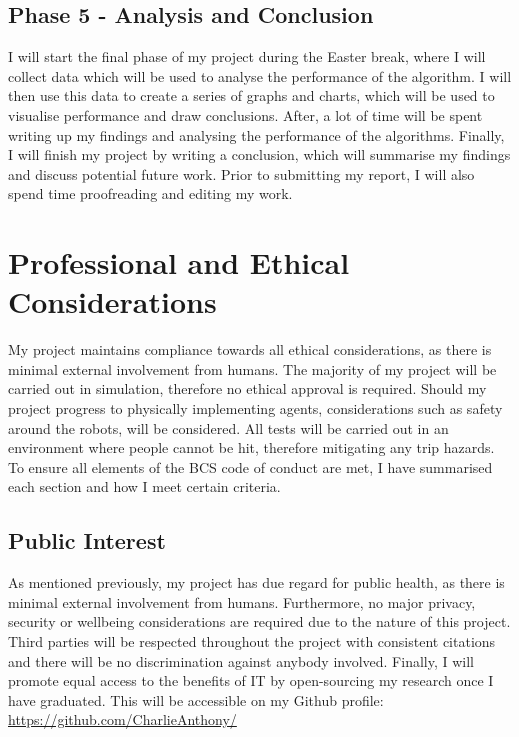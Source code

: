 \documentclass[12pt]{article}
\begin{document}
\subsection{Phase 5 - Analysis and Conclusion}
I will start the final phase of my project during the Easter break, where I will collect data which will be used to analyse
the performance of the algorithm. I will then use this data to create a series of graphs and charts, which will be used to
visualise performance and draw conclusions. After, a lot of time will be spent writing up my findings and analysing the performance
of the algorithms. Finally, I will finish my project by writing a conclusion, which will summarise my findings and discuss
potential future work. Prior to submitting my report, I will also spend time proofreading and editing my work.

\section{Professional and Ethical Considerations}
My project maintains compliance towards all ethical considerations, as there is minimal external involvement from
humans. The majority of my project will be carried out in simulation, therefore no ethical approval is required. Should
my project progress to physically implementing agents, considerations such as safety around the robots, will be considered.
All tests will be carried out in an environment where people cannot be hit, therefore mitigating any trip hazards.\\

To ensure all elements of the BCS code of conduct are met, I have summarised each section and how I meet certain criteria. \\
\subsection{Public Interest}
As mentioned previously, my project has due regard for public health, as there is minimal external involvement from humans.
Furthermore, no major privacy, security or wellbeing considerations are required due to the nature of this project. Third parties
will be respected throughout the project with consistent citations and there will be no discrimination against anybody involved.
Finally, I will promote equal access to the benefits of IT by open-sourcing my research once I have graduated. This will be accessible
on my Github profile: \href{https://github.com/CharlieAnthony/}{https://github.com/CharlieAnthony/} \\
\end{document}
